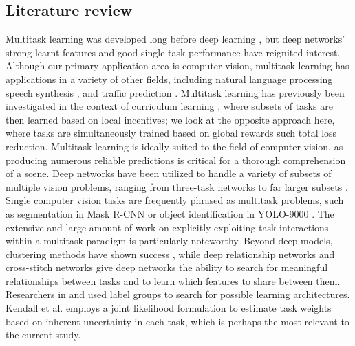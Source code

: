 \documentclass{article}
\begin{document}
\subsection{Literature review}

Multitask learning was developed long before deep learning \cite{caruana1998multitask,bakker2003task}, but deep networks' strong learnt features and good single-task performance have reignited interest. Although our primary application area is computer vision, multitask learning has applications in a variety of other fields, including natural language processing \cite{collobert2008unified,hashimoto2016joint} speech synthesis \cite{seltzer2013multi}, and traffic prediction \cite{huang2014deep}. Multitask learning has previously been investigated in the context of curriculum learning \cite{graves2017automated}, where subsets of tasks are then learned based on local incentives; we look at the opposite approach here, where tasks are simultaneously trained based on global rewards such total loss reduction. Multitask learning is ideally suited to the field of computer vision, as producing numerous reliable predictions is critical for a thorough comprehension of a scene. Deep networks have been utilized to handle a variety of subsets of multiple vision problems, ranging from three-task networks \cite{eigen2015predicting} to far larger subsets \cite{kokkinos2017ubernet}. Single computer vision tasks are frequently phrased as multitask problems, such as segmentation in Mask R-CNN \cite{he2017mask} or object identification in YOLO-9000 \cite{redmon2017yolo9000}. The extensive and large amount of work on explicitly exploiting task interactions within a multitask paradigm is particularly noteworthy. Beyond deep models, clustering methods have shown success \cite{jacob2008clustered}, while deep relationship networks \cite{long2017learning} and cross-stitch networks \cite{misra2016cross} give deep networks the ability to search for meaningful relationships between tasks and to learn which features to share between them. Researchers in \cite{warde2014self} and \cite{lu2017fully} used label groups to search for possible learning architectures. Kendall et al. \cite{kendall2018multi} employs a joint likelihood formulation to estimate task weights based on inherent uncertainty in each task, which is perhaps the most relevant to the current study.
\end{document}
